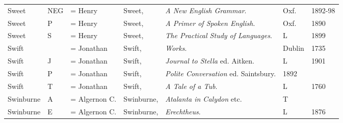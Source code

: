 \begin{sidewaystable}
\begin{tabular}{p{} p{} p{} p{} p{} p{} p{}}
Sweet & NEG & = Henry & Sweet, & \textit{A New English Grammar}. & Oxf. & 1892-98 \\
Sweet & P & = Henry & Sweet, & \textit{A Primer of Spoken English}. & Oxf. & 1890 \\
Sweet & S & = Henry & Sweet, & \textit{The Practical Study of Languages}. & L & 1899 \\
Swift & & = Jonathan & Swift, & \textit{Works}. & Dublin & 1735 \\
Swift & J & = Jonathan & Swift, & \textit{Journal to Stella} ed. Aitken. & L & 1901 \\
Swift & P & = Jonathan & Swift, & \textit{Polite Conversation} ed. Saintsbury. & 1892 \\
Swift & T & = Jonathan & Swift, & \textit{A Tale of a Tub}. & L & 1760 \\
Swinburne & A & = Algernon C. & Swinburne, & \textit{Atalanta in Calydon} etc. & T & \\
Swinburne & E & = Algernon C. & Swinburne, & \textit{Erechtheus}. & L & 1876 \\
\end{tabular}
\end{sidewaystable}


